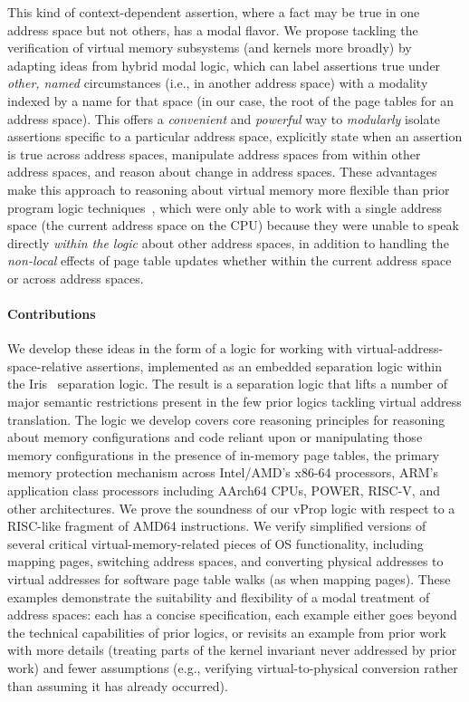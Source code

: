 This kind of context-dependent assertion, where a fact may be true in one address space but not others, has a modal flavor. 
We propose tackling the verification of virtual memory subsystems (and kernels more broadly) by adapting ideas from hybrid
modal logic, which can label assertions true under \emph{other, named} circumstances (i.e., in another address space) with a 
modality indexed by a name for that space (in our case, the root of the page tables for an address space). This offers a 
\textit{convenient} and \textit{powerful} way to \emph{modularly}
isolate assertions specific to a particular address space,
explicitly state when an assertion is true across address spaces,
manipulate address spaces from within other address spaces, and
reason about change in address spaces.
These advantages make this approach to reasoning about virtual memory more flexible than prior program logic techniques~\cite{kolanski08vstte,kolanski09tphols}, 
which were only able to work with a single address space (the current address space on the CPU) because they were unable
to speak directly \emph{within the logic} about other address spaces, in addition to handling
the \emph{non-local} effects of page table updates whether within the current address space or across address spaces.

\paragraph{Contributions}
We develop these ideas in the form of a logic for working with virtual-address-space-relative assertions,
implemented as an embedded separation logic within the Iris~\cite{jung2018iris} separation logic.
The result is a separation logic that lifts a number of major semantic restrictions present in the few
prior logics tackling virtual address translation.
The logic we develop covers core reasoning principles for reasoning about memory configurations and code
reliant upon or manipulating those memory configurations in the presence of in-memory page tables, the primary
memory protection mechanism across Intel/AMD's x86-64 processors, ARM's application class processors including
AArch64 CPUs, POWER, RISC-V, and other architectures.
We prove the soundness of our \textsf{vProp} logic with respect to a RISC-like fragment of \textsf{AMD64} instructions.
We verify simplified versions of several critical virtual-memory-related pieces of OS functionality, 
including mapping  pages, switching address spaces, and converting physical addresses to virtual addresses for
software page table walks (as when mapping pages). These examples demonstrate the suitability and flexibility of
a modal treatment of address spaces: each has a concise specification, each example either goes beyond the technical
capabilities of prior logics, or revisits an example from prior work with more details (treating parts of the kernel
invariant never addressed by prior work) and fewer assumptions (e.g., verifying virtual-to-physical conversion rather
than assuming it has already occurred).

